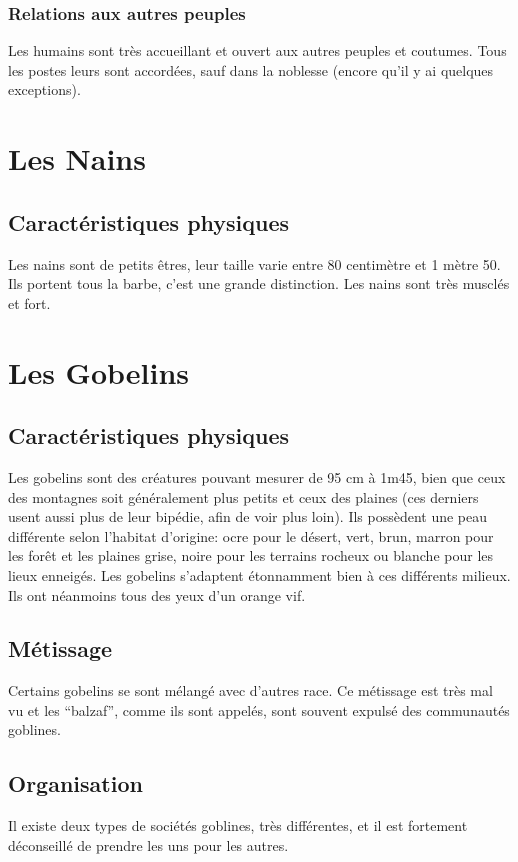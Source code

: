 \subsubsection{Relations aux autres peuples}
Les humains sont très accueillant et ouvert aux autres peuples et coutumes. Tous les postes leurs sont accordées, sauf dans la noblesse (encore qu’il y ai quelques exceptions). 

\section{Les Nains}
\subsection{Caractéristiques physiques}
Les nains sont de petits êtres, leur taille varie entre 80 centimètre et 1 mètre 50. Ils portent tous la barbe, c'est une grande distinction. Les nains sont très musclés et fort. 

\section{Les Gobelins}
\subsection{Caractéristiques physiques}
Les gobelins sont des créatures pouvant mesurer de 95 cm à 1m45, bien que ceux des montagnes soit généralement plus petits et ceux des plaines (ces derniers usent aussi plus de leur bipédie, afin de voir plus loin). Ils possèdent une peau différente selon l’habitat d’origine: ocre pour le désert, vert, brun, marron pour les forêt et les plaines grise, noire pour les terrains rocheux ou blanche pour les lieux enneigés. Les gobelins s'adaptent étonnamment bien à ces différents milieux. Ils ont néanmoins tous des yeux d'un orange vif.
\subsection{Métissage}
Certains gobelins se sont mélangé avec d'autres race. Ce métissage est très mal vu et les “balzaf”, comme ils sont appelés, sont souvent expulsé des communautés goblines.
\subsection{Organisation}
Il existe deux types de sociétés goblines, très différentes, et il est fortement déconseillé de prendre les uns pour les autres.
